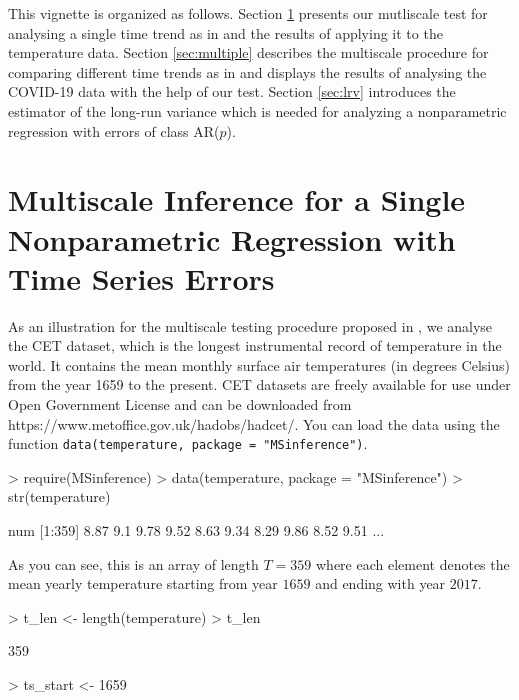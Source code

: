 \documentclass[a4paper]{article}
\begin{document}
This vignette is organized as follows. Section \ref{sec:single} presents our mutliscale test for analysing a single time trend as in\cite{KhismatullinaVogt2020} and the results of applying it to the temperature data. Section \ref{sec:multiple} describes the multiscale procedure for comparing different time trends as in \cite{KhismatullinaVogt2023} and displays the results of analysing the COVID-19 data with the help of our test. Section \ref{sec:lrv} introduces the estimator of the long-run variance which is needed for analyzing a nonparametric regression with errors of class AR($p$). %

\begin{Schunk}
\end{Schunk}

\section{Multiscale Inference for a Single Nonparametric Regression with Time Series Errors}\label{sec:single}

As an illustration for the multiscale testing procedure proposed in \cite{KhismatullinaVogt2020}, we analyse the CET dataset, which is the longest instrumental record of temperature in the world. It contains the mean monthly surface air temperatures (in degrees Celsius) from the year 1659 to the present. CET datasets are freely available for use under Open Government License and can be downloaded from https://www.metoffice.gov.uk/hadobs/hadcet/. You can load the data using the function \verb|data(temperature, package = "MSinference")|.

\begin{Schunk}
\begin{Sinput}
> require(MSinference)
> data(temperature, package = "MSinference")
> str(temperature)
\end{Sinput}
\begin{Soutput}
 num [1:359] 8.87 9.1 9.78 9.52 8.63 9.34 8.29 9.86 8.52 9.51 ...
\end{Soutput}
\end{Schunk}

As you can see, this is an array of length $T = 359$ where each element denotes the mean yearly temperature starting from year $1659$ and ending with year $2017$.

\begin{Schunk}
\begin{Sinput}
> t_len    <- length(temperature)
> t_len
\end{Sinput}
\begin{Soutput}
[1] 359
\end{Soutput}
\begin{Sinput}
> ts_start <- 1659
\end{Sinput}
\end{Schunk}
\end{document}
